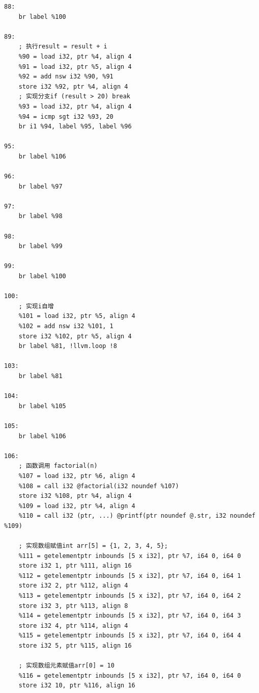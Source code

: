 \documentclass[UTF8,a4paper,10pt]{ctexart}
\begin{document}
\begin{lstlisting}
88:                                              
	br label %100

89:                                            
	; 执行result = result + i
	%90 = load i32, ptr %4, align 4
	%91 = load i32, ptr %5, align 4
	%92 = add nsw i32 %90, %91
	store i32 %92, ptr %4, align 4
	; 实现分支if (result > 20) break
	%93 = load i32, ptr %4, align 4
	%94 = icmp sgt i32 %93, 20
	br i1 %94, label %95, label %96

95:                                               
	br label %106

96:                                               
	br label %97

97:                                               
	br label %98

98:                                              
	br label %99

99:                                               
	br label %100

100:                                           
	; 实现i自增
	%101 = load i32, ptr %5, align 4
	%102 = add nsw i32 %101, 1
	store i32 %102, ptr %5, align 4
	br label %81, !llvm.loop !8

103:                                              
	br label %81

104:                                              
	br label %105

105:                                             
	br label %106

106:                                             
	; 函数调用 factorial(n)
	%107 = load i32, ptr %6, align 4
	%108 = call i32 @factorial(i32 noundef %107)
	store i32 %108, ptr %4, align 4
	%109 = load i32, ptr %4, align 4
	%110 = call i32 (ptr, ...) @printf(ptr noundef @.str, i32 noundef %109)

	; 实现数组赋值int arr[5] = {1, 2, 3, 4, 5};
	%111 = getelementptr inbounds [5 x i32], ptr %7, i64 0, i64 0
	store i32 1, ptr %111, align 16
	%112 = getelementptr inbounds [5 x i32], ptr %7, i64 0, i64 1
	store i32 2, ptr %112, align 4
	%113 = getelementptr inbounds [5 x i32], ptr %7, i64 0, i64 2
	store i32 3, ptr %113, align 8
	%114 = getelementptr inbounds [5 x i32], ptr %7, i64 0, i64 3
	store i32 4, ptr %114, align 4
	%115 = getelementptr inbounds [5 x i32], ptr %7, i64 0, i64 4
	store i32 5, ptr %115, align 16

	; 实现数组元素赋值arr[0] = 10
	%116 = getelementptr inbounds [5 x i32], ptr %7, i64 0, i64 0
	store i32 10, ptr %116, align 16


\end{lstlisting}
\end{document}
